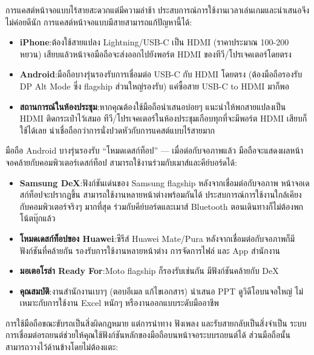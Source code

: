 การแคสต์หน้าจอแบบไร้สายสะดวกแต่มีความล่าช้า ประสบการณ์การใช้งานเวลาเล่นเกมและนำเสนอจึงไม่ค่อยดีนัก การแคสต์หน้าจอแบบมีสายสามารถแก้ปัญหานี้ได้:

\begin{itemize}
  \item \textbf{iPhone}:ต้องใช้สายแปลง Lightning/USB-C เป็น HDMI (ราคาประมาณ 100-200 หยวน) เสียบแล้วหน้าจอมือถือจะส่งออกไปยังพอร์ต HDMI ของทีวี/โปรเจคเตอร์โดยตรง
  \item \textbf{Android}:มือถือบางรุ่นรองรับการเชื่อมต่อ USB-C กับ HDMI โดยตรง (ต้องมือถือรองรับ DP Alt Mode ซึ่ง flagship ส่วนใหญ่รองรับ) แค่ซื้อสาย USB-C to HDMI มาก็พอ
  \item \textbf{สถานการณ์ในห้องประชุม}:หากคุณต้องใช้มือถือนำเสนอบ่อยๆ แนะนำให้พกสายแปลงเป็น HDMI ติดกระเป๋าไว้เสมอ ทีวี/โปรเจคเตอร์ในห้องประชุมเกือบทุกที่จะมีพอร์ต HDMI เสียบก็ใช้ได้เลย น่าเชื่อถือกว่าการนั่งปวดหัวกับการแคสต์แบบไร้สายมาก
\end{itemize}


มือถือ Android บางรุ่นรองรับ “โหมดเดสก์ท็อป” — เมื่อต่อกับจอภาพแล้ว มือถือจะแสดงผลหน้าจอคล้ายกับคอมพิวเตอร์เดสก์ท็อป สามารถใช้งานร่วมกับเมาส์และคีย์บอร์ดได้:

\begin{itemize}
  \item \textbf{Samsung DeX}:ฟังก์ชันเด่นของ Samsung flagship หลังจากเชื่อมต่อกับจอภาพ หน้าจอเดสก์ท็อปจะปรากฏขึ้น สามารถใช้งานหลายหน้าต่างพร้อมกันได้ ประสบการณ์การใช้งานใกล้เคียงกับคอมพิวเตอร์จริงๆ มากที่สุด ร่วมกับคีย์บอร์ดและเมาส์ Bluetooth ตอนเดินทางก็ไม่ต้องพกโน้ตบุ๊กแล้ว
  \item \textbf{โหมดเดสก์ท็อปของ Huawei}:ซีรีส์ Huawei Mate/Pura หลังจากเชื่อมต่อกับจอภาพก็มีฟังก์ชันที่คล้ายกัน รองรับการใช้งานหลายหน้าต่าง การจัดการไฟล์ และ App สำนักงาน
  \item \textbf{มอเตอโรล่า Ready For}:Moto flagship ก็รองรับเช่นกัน มีฟังก์ชันคล้ายกับ DeX
  \item \textbf{คุณสมบัติ}:งานสำนักงานเบาๆ (ตอบอีเมล แก้ไขเอกสาร) นำเสนอ PPT ดูวิดีโอบนจอใหญ่ ไม่เหมาะกับการใช้งาน Excel หนักๆ หรืองานออกแบบระดับมืออาชีพ
\end{itemize}


การใช้มือถือขณะขับรถเป็นสิ่งผิดกฎหมาย แต่การนำทาง ฟังเพลง และรับสายกลับเป็นสิ่งจำเป็น ระบบการเชื่อมต่อรถยนต์ช่วยให้คุณใช้ฟังก์ชันหลักของมือถือบนหน้าจอระบบรถยนต์ได้ ส่วนมือถือนั้นสามารถวางไว้ด้านข้างโดยไม่ต้องแตะ:

